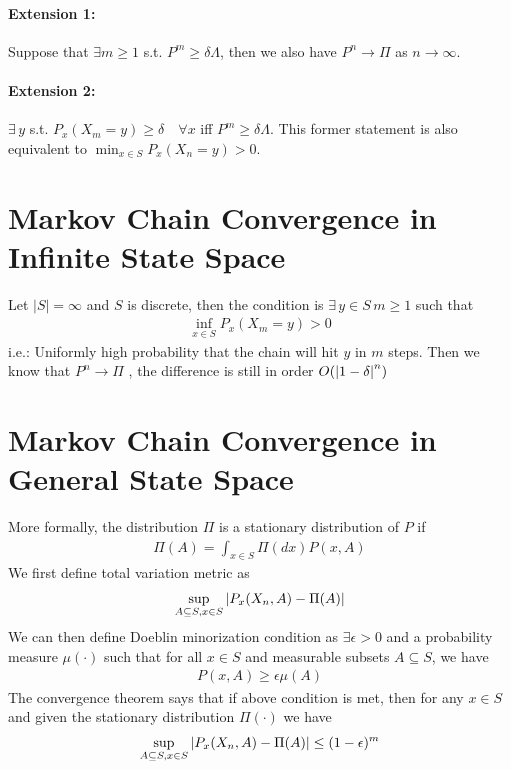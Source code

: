 \paragraph{Extension 1: } Suppose that $\exists m \geq 1$ s.t. $P^m \geq \delta \Lambda$, then we also have $P^n \to \Pi$ as $n \to \infty$. 

\paragraph{Extension 2: } $\exists \, y$ s.t. $P_x(X_m = y) \geq \delta \quad \forall x$ iff $P^m \geq \delta \Lambda$. This former statement is also equivalent to $\min_{x\in S} P_x(X_n = y) > 0$. 

\section{Markov Chain Convergence in Infinite State Space} 
Let $|S|=\infty$ and $S$ is discrete, then the condition is $\exists \, y \in S \, m \geq 1$ such that 
    \begin{align*}
        \inf_{x\in S} P_x(X_m = y) > 0
    \end{align*}
i.e.: Uniformly high probability that the chain will hit $y$ in $m$ steps. Then we know that $P^n \to \Pi$ , the difference is still in order $O(\left| 1-\delta \right|^n)$

\section{Markov Chain Convergence in General State Space} 
More formally, the distribution $\Pi$ is a stationary distribution of $P$ if 
    \begin{align*}
        \Pi(A) = \int_{x\in S} \Pi(dx) P(x, A)
    \end{align*}
We first define total variation metric as 
    \begin{align*}
        \sup_{A\subseteq S, x\in S} \left| P_x(X_n, A) - \Pi(A) \right|
    \end{align*}
We can then define Doeblin minorization condition as $\exists \epsilon > 0$ and a probability measure $\mu(\cdot)$ such that for all $x\in S$ and measurable subsets $A \subseteq S$, we have 
    \begin{align*}
        P(x, A) \geq \epsilon \mu(A)
    \end{align*}
The convergence theorem says that if above condition is met, then for any $x\in S$ and given the stationary distribution $\Pi(\cdot)$ we have 
    \begin{align*}
         \sup_{A\subseteq S, x\in S} \left| P_x(X_n, A) - \Pi(A) \right| \leq (1-\epsilon)^m
    \end{align*}
    
